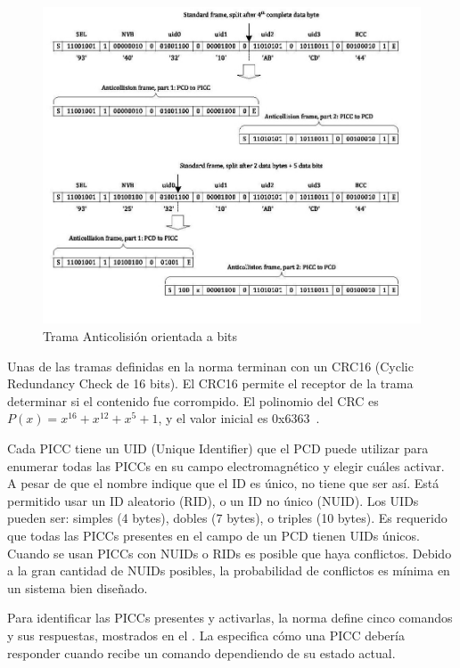 \documentclass[a4paper, twoside, 11pt]{report}
\begin{document}
\begin{figure}[htb]
  \centering
  \includegraphics[scale=0.5]{./img/anticollision_frames}
  \caption{Trama Anticolisión orientada a bits~\cite[Modificaciones Mías]{iso14443-3}}
  \label{fig:anticollision}
\end{figure}

Unas de las tramas definidas en la norma terminan con un CRC16 (Cyclic Redundancy Check de 16 bits). El CRC16 permite el receptor de la trama determinar si el contenido fue corrompido. El polinomio del CRC es $P\left(x\right) = x^{16} + x^{12} + x^{5} + 1$, y el valor inicial es 0x6363~\cite{iso14443-3}\cite{iso13239}.

Cada PICC tiene un UID (Unique Identifier) que el PCD puede utilizar para enumerar todas las PICCs en su campo electromagnético y elegir cuáles activar. A pesar de que el nombre indique que el ID es único, no tiene que ser así. Está permitido usar un ID aleatorio (RID), o un ID no único (NUID). Los UIDs pueden ser: simples (4 bytes), dobles (7 bytes), o triples (10 bytes). Es requerido que todas las PICCs presentes en el campo de un PCD tienen UIDs únicos. Cuando se usan PICCs con NUIDs o RIDs es posible que haya conflictos. Debido a la gran cantidad de NUIDs posibles, la probabilidad de conflictos es mínima en un sistema bien diseñado.

Para identificar las PICCs presentes y activarlas, la norma define cinco comandos y sus respuestas, mostrados en el . La  especifica cómo una PICC debería responder cuando recibe un comando dependiendo de su estado actual.
\end{document}
